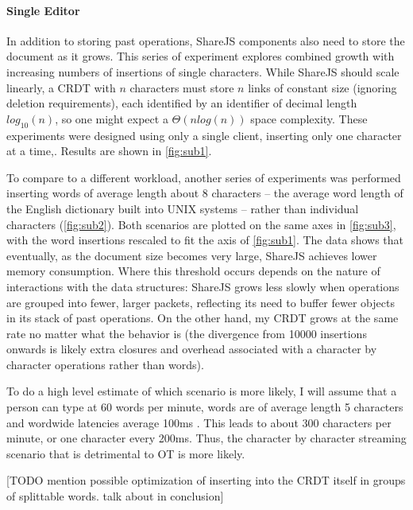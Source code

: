 \documentclass[12pt,a4paper,twoside,openright]{report}
\begin{document}
			\paragraph{Single Editor} \label{sec:singleeditor}
				In addition to storing past operations, ShareJS components also need to store the document as it grows. This series of experiment explores combined growth with increasing numbers of insertions of single characters. While ShareJS should scale linearly, a CRDT with $n$ characters must store $n$ links of constant size (ignoring deletion requirements), each identified by an identifier of decimal length $log_{10}(n)$, so one might expect a $\Theta (nlog(n))$ space complexity. These experiments were designed using only a single client, inserting only one character at a time,. Results are shown in \ref{fig:sub1}.
					
				To compare to a different workload, another series of experiments was performed inserting words of average length about 8 characters -- the average word length of the English dictionary built into UNIX systems -- rather than individual characters (\ref{fig:sub2}). Both scenarios are plotted on the same axes in \ref{fig:sub3}, with the word insertions rescaled to fit the axis of \ref{fig:sub1}. The data shows that eventually, as the document size becomes very large, ShareJS achieves lower memory consumption. Where this threshold occurs depends on the nature of interactions with the data structures: ShareJS grows less slowly when operations are grouped into fewer, larger packets, reflecting its need to buffer fewer objects in its stack of past operations. On the other hand, my CRDT grows at the same rate no matter what the behavior is (the divergence from 10000 insertions onwards is likely extra closures and overhead associated with a character by character operations rather than words). 
				
				To do a high level estimate of which scenario is more likely, I will assume that a person can type at 60 words per minute, words are of average length 5 characters \cite{bochkarev2012average} and wordwide latencies average 100ms \cite{latencies} \cite{fccbroadband}. This leads to about 300 characters per minute, or one character every 200ms. Thus, the character by character streaming scenario that is detrimental to OT is more likely.
				
				[TODO mention possible optimization of inserting into the CRDT itself in groups of splittable words. talk about in conclusion]
				
\end{document}
